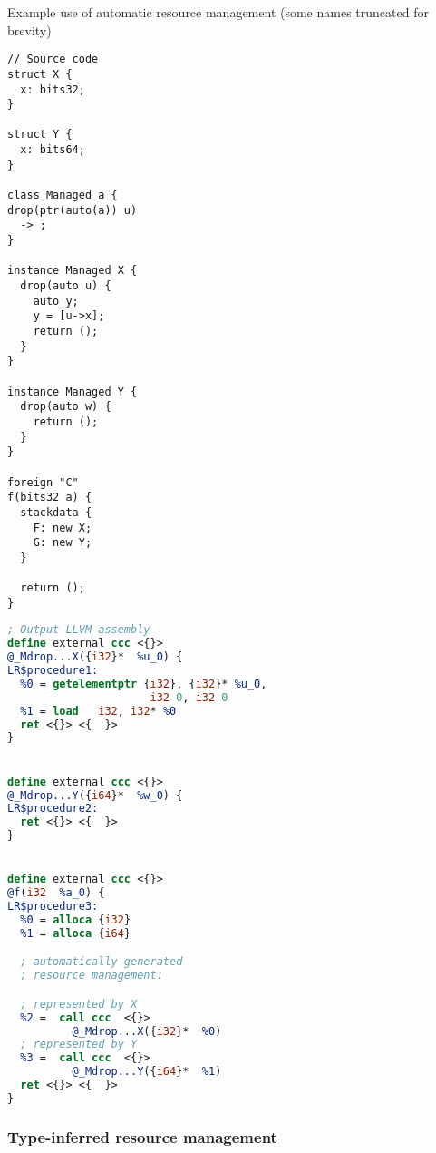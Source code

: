 \begin{listing}
    \small
    \caption{Example use of automatic resource management (some names truncated for brevity)}
    \label{lst:resource}
    \begin{center}
    \begin{minipage}{0.35\linewidth}
    \begin{lstlisting}
// Source code
struct X {
  x: bits32;
}

struct Y {
  x: bits64;
}

class Managed a {
drop(ptr(auto(a)) u)
  -> ;
}

instance Managed X {
  drop(auto u) {
    auto y;
    y = [u->x];
    return ();
  }
}

instance Managed Y {
  drop(auto w) {
    return ();
  }
}

foreign "C"
f(bits32 a) {
  stackdata {
    F: new X;
    G: new Y;
  }

  return ();
}
    \end{lstlisting}
    \end{minipage}%
    \begin{minipage}{0.65\linewidth}
    \begin{lstlisting}[language=LLVM]
; Output LLVM assembly
define external ccc <{}>
@_Mdrop...X({i32}*  %u_0) {
LR$procedure1:
  %0 = getelementptr {i32}, {i32}* %u_0,
                      i32 0, i32 0
  %1 = load   i32, i32* %0
  ret <{}> <{  }>
}


define external ccc <{}>
@_Mdrop...Y({i64}*  %w_0) {
LR$procedure2:
  ret <{}> <{  }>
}


define external ccc <{}>
@f(i32  %a_0) {
LR$procedure3:
  %0 = alloca {i32}
  %1 = alloca {i64}

  ; automatically generated
  ; resource management:

  ; represented by X
  %2 =  call ccc  <{}>
          @_Mdrop...X({i32}*  %0)
  ; represented by Y
  %3 =  call ccc  <{}>
          @_Mdrop...Y({i64}*  %1)
  ret <{}> <{  }>
}
    \end{lstlisting}
    \end{minipage}
    \end{center}
\end{listing}

\subsubsection{Type-inferred resource management}

